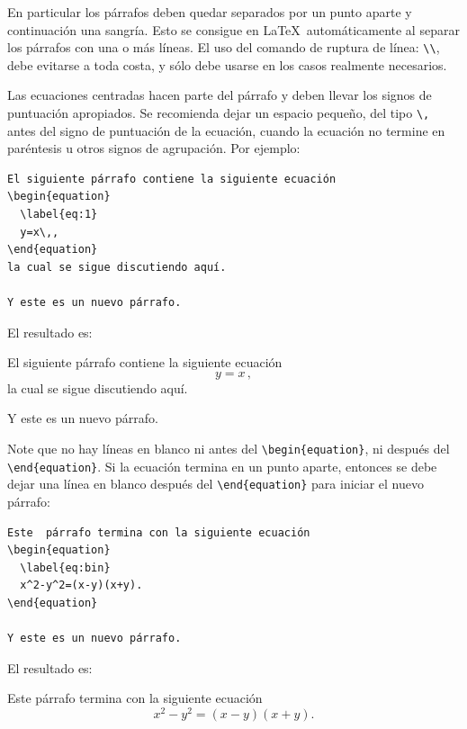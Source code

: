 \documentclass{article}
\begin{document}
En particular los párrafos deben quedar separados por un punto aparte y continuación una sangría.%
Esto se consigue en \LaTeX\ automáticamente al separar los párrafos con una o más líneas. El uso del comando de ruptura de línea: \verb|\\|, debe evitarse a toda costa, y sólo debe usarse en los casos realmente necesarios.  


Las ecuaciones centradas hacen parte del párrafo y deben llevar los signos de puntuación apropiados. Se recomienda dejar un espacio pequeño, del tipo \verb|\,| antes del signo de puntuación de la ecuación, cuando la ecuación no termine en paréntesis u otros signos de agrupación. Por ejemplo:
\begin{lstlisting}
El siguiente párrafo contiene la siguiente ecuación
\begin{equation}
  \label{eq:1}
  y=x\,,
\end{equation}
la cual se sigue discutiendo aquí.

Y este es un nuevo párrafo.
\end{lstlisting}
El resultado es:

El siguiente párrafo contiene la siguiente ecuación
\begin{equation}
  \label{eq:1}
  y=x\,,
\end{equation}
la cual se sigue discutiendo aquí.

Y este es un nuevo párrafo.

\bigskip

Note que no hay líneas en blanco ni antes del \verb|\begin{equation}|, ni después del \verb|\end{equation}|. Si la ecuación termina en un punto aparte, entonces se debe dejar una línea en blanco después del \verb|\end{equation}| para iniciar el nuevo párrafo:

\begin{lstlisting}
Este  párrafo termina con la siguiente ecuación
\begin{equation}
  \label{eq:bin}
  x^2-y^2=(x-y)(x+y).
\end{equation}

Y este es un nuevo párrafo.
\end{lstlisting}
El resultado es:

Este  párrafo termina con la siguiente ecuación
\begin{equation}
  \label{eq:bin}
  x^2-y^2=(x-y)(x+y).
\end{equation}
\end{document}

